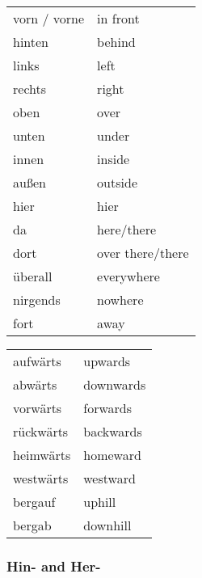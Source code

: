 \documentclass[a4paper,twocolumn,10pt]{article}
\newcommand{\tabularxtable}[3]
{

	\vspace{0.5cm}
	\nolinenumbers

	\begin{tabularx}{#1}{#2}
		#3
	\end{tabularx}

	\linenumbers
	\vspace{0.5cm}
}
\begin{document}
\tabularxtable
{0.95\linewidth}
{lX}
{

\rowcolor{white}     vorn / vorne & in front\\
\rowcolor{lightgray} hinten       & behind\\
\rowcolor{white}     links        & left\\
\rowcolor{lightgray} rechts       & right\\
\rowcolor{white}     oben         & over\\
\rowcolor{lightgray} unten        & under\\
\rowcolor{white}     innen        & inside\\
\rowcolor{lightgray} außen        & outside\\
\rowcolor{white}     hier         & hier\\
\rowcolor{lightgray} da           & here/there\\
\rowcolor{white}     dort         & over there/there\\
\rowcolor{lightgray} überall      & everywhere\\
\rowcolor{white}     nirgends     & nowhere\\
\rowcolor{lightgray} fort      & away\\


}


\tabularxtable
{0.95\linewidth}
{lX}
{
\rowcolor{white}     aufwärts  & upwards\\
\rowcolor{lightgray} abwärts   & downwards\\
\rowcolor{white}     vorwärts  & forwards\\
\rowcolor{lightgray} rückwärts & backwards\\
\rowcolor{white}     heimwärts & homeward\\
\rowcolor{lightgray} westwärts & westward\\
\rowcolor{white}     bergauf   & uphill\\
\rowcolor{lightgray} bergab    & downhill\\


}




\subsubsection{Hin- and Her-}
\label{sssec:hin_and_her_}
\end{document}
